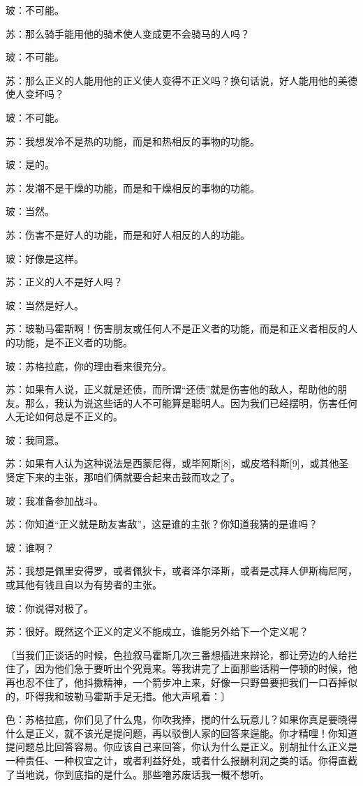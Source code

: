 \documentclass[12pt,oneside]{book}
\begin{document}
玻：不可能。

苏：那么骑手能用他的骑术使人变成更不会骑马的人吗？

玻：不可能。

苏：那么正义的人能用他的正义使人变得不正义吗？换句话说，好人能用他的美德使人变坏吗？

玻：不可能。

苏：我想发冷不是热的功能，而是和热相反的事物的功能。

玻：是的。

苏：发潮不是干燥的功能，而是和干燥相反的事物的功能。

玻：当然。

苏：伤害不是好人的功能，而是和好人相反的人的功能。

玻：好像是这样。

苏：正义的人不是好人吗？

玻：当然是好人。

苏：玻勒马霍斯啊！伤害朋友或任何人不是正义者的功能，而是和正义者相反的人的功能，是不正义者的功能。

玻：苏格拉底，你的理由看来很充分。

苏：如果有人说，正义就是还债，而所谓“还债”就是伤害他的敌人，帮助他的朋友。那么，我认为说这些话的人不可能算是聪明人。因为我们已经摆明，伤害任何人无论如何总是不正义的。

玻：我同意。

苏：如果有人认为这种说法是西蒙尼得，或毕阿斯[8]，或皮塔科斯[9]，或其他圣贤定下来的主张，那咱们俩就要合起来击鼓而攻之了。

玻：我准备参加战斗。

苏：你知道“正义就是助友害敌”，这是谁的主张？你知道我猜的是谁吗？

玻：谁啊？

苏：我想是佩里安得罗，或者佩狄卡，或者泽尔泽斯，或者是忒拜人伊斯梅尼阿，或其他有钱且自以为有势者的主张。

玻：你说得对极了。

苏：很好。既然这个正义的定义不能成立，谁能另外给下一个定义呢？

〔当我们正谈话的时候，色拉叙马霍斯几次三番想插进来辩论，都让旁边的人给拦住了，因为他们急于要听出个究竟来。等我讲完了上面那些话稍一停顿的时候，他再也忍不住了，他抖擞精神，一个箭步冲上来，好像一只野兽要把我们一口吞掉似的，吓得我和玻勒马霍斯手足无措。他大声吼着：〕

色：苏格拉底，你们见了什么鬼，你吹我捧，搅的什么玩意儿？如果你真是要晓得什么是正义，就不该光是提问题，再以驳倒人家的回答来逞能。你才精哩！你知道提问题总比回答容易。你应该自己来回答，你认为什么是正义。别胡扯什么正义是一种责任、一种权宜之计，或者利益好处，或者什么报酬利润之类的话。你得直截了当地说，你到底指的是什么。那些噜苏废话我一概不想听。
\end{document}

